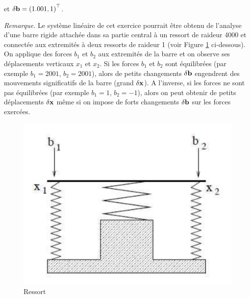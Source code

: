 \begin{enumerate}[label=\alph*)]
  et $\delta \mathbf{b} = \left(1.001, 1\right)^{\top}$.
  
  \textit{Remarque.}
  Le système linéaire de cet exercice pourrait être obtenu de l'analyse d'une barre rigide attachée dans sa partie central à un ressort de raideur 4000 et connectée aux extremités à deux ressorts de raideur 1 (voir Figure \ref{fig:ressort} ci-dessous).
  On applique des forces $b_{1}$ et $b_{2}$ aux extremités de la barre et on observe ses déplacements verticaux $x_{1}$ et $x_{2}$.
  Si les forces $b_{1}$ et $b_{2}$ sont équilibrées (par exemple $b_{1} = 2001$, $b_{2} = 2001$), alors de petits changements $\delta \mathbf{b}$ engendrent des mouvements significatifs de la barre (grand $\delta \mathbf{x}$).
  A l'inverse, si les forces ne sont pas équilibrées (par exemple $b_{1} = 1$, $b_{2} = -1$), alors on peut obtenir de petits déplacements $\delta \mathbf{x}$ même si on impose de forts changements $\delta \mathbf{b}$ sur les forces exercées.
  
  \begin{figure}[h!]
    \centering
    \includegraphics[scale = 0.2]{s2/images/ressort.png}
    \caption{Ressort}
    \label{fig:ressort}
  \end{figure}


\end{enumerate}




